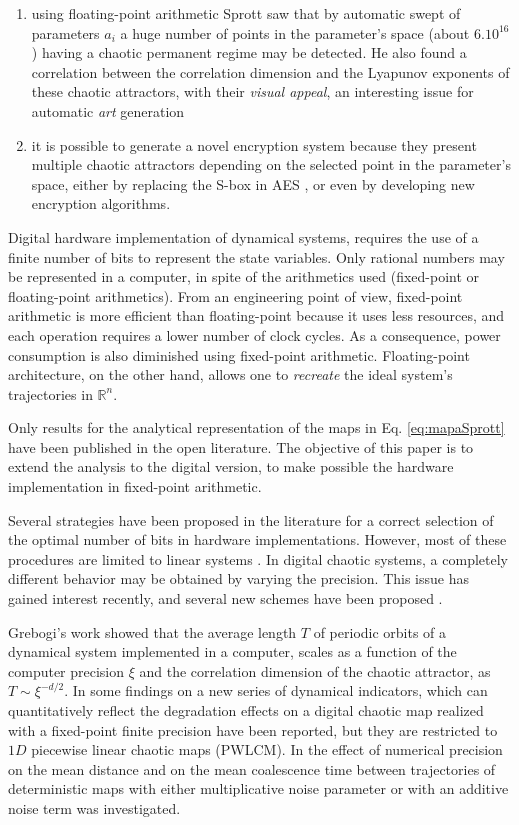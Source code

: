 \begin{enumerate}
\item using floating-point arithmetic Sprott saw
that by automatic swept of parameters $a_i$ a huge number of
points in the parameter's space (about $6  .  10^{16}$) having
a chaotic permanent regime may be detected. He also
found a correlation between the correlation dimension and the
Lyapunov exponents of these chaotic attractors, with their
\textsl{visual appeal}, an interesting issue for automatic
\textsl{art} generation
\item it is possible to generate a novel encryption system because
they present multiple chaotic attractors depending on the selected
point in the parameter's space, either by replacing the S-box in AES \cite{Ahmad2013,Hussain2013}, or even by developing new encryption algorithms.
\end{enumerate}

Digital hardware implementation of dynamical systems, requires the use of
a finite number of bits to represent the state variables. Only rational numbers may be represented in a computer, in spite of the arithmetics used (fixed-point or floating-point arithmetics). From an engineering point of view, fixed-point arithmetic is more efficient than floating-point because it uses less resources, and each operation requires a lower number of clock cycles. As a consequence, power consumption is also diminished using fixed-point arithmetic. Floating-point architecture, on the other hand,  allows one to \textsl{recreate} the ideal system's trajectories in $\mathbb{R}^n$.

Only results for the analytical representation of the
maps in Eq. \ref{eq:mapaSprott} have been published in the open literature. The objective of
this paper is to extend the analysis to the digital version, to make
possible  the hardware implementation in fixed-point arithmetic.

Several strategies have been proposed in the literature for a correct
selection of the optimal number of bits in hardware
implementations. However, most of these procedures are limited to linear systems
\cite{Constantinides2002,Constantinides2003}. In digital
chaotic systems, a completely different behavior may be obtained by
varying the precision.  This issue  has gained interest recently,
and several new schemes have been proposed
\cite{Ding2007,Asseri2002,Azzaz2009}.

Grebogi's work \cite{Grebogi1988} showed that the average
length $T$  of periodic orbits of a dynamical system implemented in a computer, scales as a
function of the computer precision $\xi$  and the correlation dimension
 of the chaotic attractor, as $T \sim  \xi^{-d/2}$. In
\cite{SHUJUN2005} some findings on a new series of dynamical
indicators, which can quantitatively reflect the degradation
effects on a digital chaotic map realized with a fixed-point
finite precision have been reported, but they are restricted to $1D$
piecewise linear chaotic maps (PWLCM). In \cite{Dias2011} the effect of numerical precision on the mean
distance and on the mean coalescence time between trajectories of deterministic maps with either multiplicative noise parameter or with an additive noise term was investigated.

